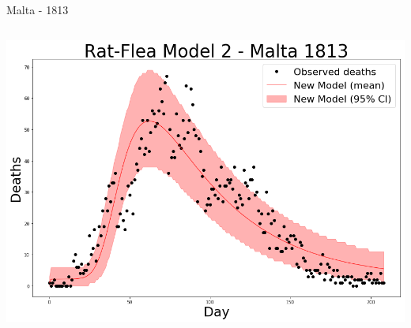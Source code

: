 \documentclass[t,10pt,fleqn]{beamer}
\begin{document}
\begin{frame}{Malta - 1813}
\begin{columns}
		\includegraphics[width=\linewidth]{rats2/malta-40-30-22-15x10}

	\end{columns}
\end{frame}
\end{document}
